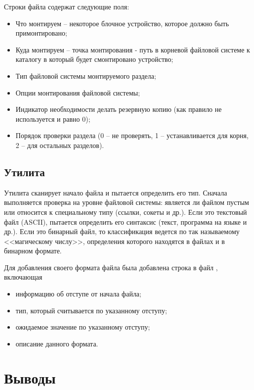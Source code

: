 Строки файла содержат следующие поля:
\begin{itemize}
	\item Что монтируем -- некоторое блочное устройство, которое должно быть примонтировано;
	\item Куда монтируем -- точка монтирования - путь в корневой файловой системе к каталогу в который будет смонтировано устройство;
	\item Тип файловой системы монтируемого раздела;
	\item Опции монтирования файловой системы;
	\item Индикатор необходимости делать резервную копию (как правило не используется и равно 0);
	\item Порядок проверки раздела (0 -- не проверять, 1 -- устанавливается для корня, 2 -- для остальных разделов).
\end{itemize}

\subsection{Утилита }

Утилита  сканирует начало файла и пытается определить его тип. Сначала выполняется проверка на уровне файловой системы: является ли файлом пустым или относится к специальному типу (ссылки, сокеты и др.). Если это текстовый файл (ASCII),  пытается определить его синтаксис (текст, программа на языке  и др.). Если это бинарный файл, то классификация ведется по так называемому <<магическому числу>>, определения которого находятся в файлах  и  в бинарном формате.



Для добавления своего формата файла была добавлена строка в файл , включающая 
\begin{itemize}
	\item информацию об отступе от начала файла;
	\item тип, который считывается по указанному отступу;
	\item ожидаемое значение по указанному отступу;
	\item описание данного формата.
\end{itemize}


\section{Выводы}

